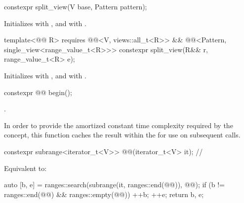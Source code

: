 \begin{itemdecl}
constexpr split_view(V base, Pattern pattern);
\end{itemdecl}

\begin{itemdescr}
\pnum
\effects
Initializes  with , and
 with .
\end{itemdescr}

%
\begin{itemdecl}
template<@@ R>
  requires @@<V, views::all_t<R>> &&
           @@<Pattern, single_view<range_value_t<R>>>
constexpr split_view(R&& r, range_value_t<R> e);
\end{itemdecl}

\begin{itemdescr}
\pnum
\effects
Initializes  with , and
 with .
\end{itemdescr}

\begin{itemdecl}
constexpr @@ begin();
\end{itemdecl}

\begin{itemdescr}
\pnum
\returns
{}.

\pnum
\remarks
In order to provide the amortized constant time complexity
required by the  concept,
this function caches the result within the 
for use on subsequent calls.
\end{itemdescr}

\begin{itemdecl}
constexpr subrange<iterator_t<V>> @@(iterator_t<V> it); // \expos
\end{itemdecl}

\begin{itemdescr}
\pnum
\effects
Equivalent to:
\begin{codeblock}
auto [b, e] = ranges::search(subrange(it, ranges::end(@@)), @@);
if (b != ranges::end(@@) && ranges::empty(@@)) {
  ++b;
  ++e;
}
return {b, e};
\end{codeblock}
\end{itemdescr}


